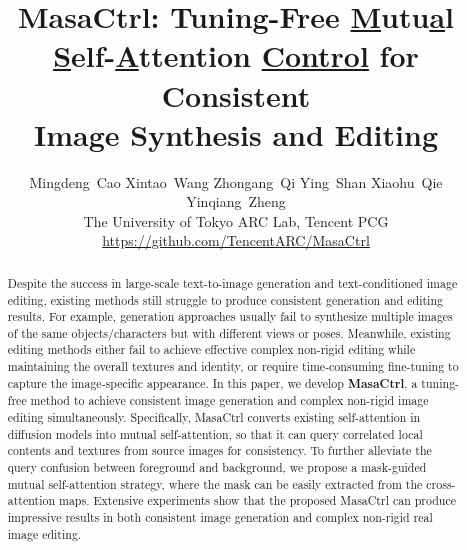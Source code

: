 \documentclass[10pt,twocolumn,letterpaper]{article}
\begin{document}
\title{MasaCtrl: Tuning-Free \underline{M}utu\underline{a}l \underline{S}elf-\underline{A}ttention \underline{Control} for Consistent \\Image Synthesis and Editing}

\author{
\vspace{0.2cm}
Mingdeng~Cao\quad
Xintao~Wang\Envelope\quad
Zhongang~Qi\quad
Ying~Shan\quad
Xiaohu~Qie\quad
Yinqiang~Zheng\Envelope \\
The University of Tokyo \qquad ARC Lab, Tencent PCG \vspace{0.2cm} \\
\large\url{https://github.com/TencentARC/MasaCtrl}\vspace{-0.4cm}
}

\newcommand{\xt}[1]{{\color{red}{Xintao: #1}}}



\newcommand*{\method}{\mbox{MasaCtrl}}



\begin{abstract}
\let\thefootnote\relax{}
Despite the success in large-scale text-to-image generation and text-conditioned image editing, existing methods still struggle to produce consistent generation and editing results. For example, generation approaches usually fail to synthesize multiple images of the same objects/characters but with different views or poses. Meanwhile, existing editing methods either fail to achieve effective complex non-rigid editing while maintaining the overall textures and identity, or require time-consuming fine-tuning to capture the image-specific appearance. In this paper, we develop \textbf{MasaCtrl}, a tuning-free method to achieve consistent image generation and complex non-rigid image editing simultaneously. Specifically, MasaCtrl converts existing self-attention in diffusion models into mutual self-attention, so that it can query correlated local contents and textures from source images for consistency. To further alleviate the query confusion between foreground and background, we propose a mask-guided mutual self-attention strategy, where the mask can be easily extracted from the cross-attention maps. Extensive experiments show that the proposed MasaCtrl can produce impressive results in both consistent image generation and complex non-rigid real image editing.
\end{abstract}
\end{document}
